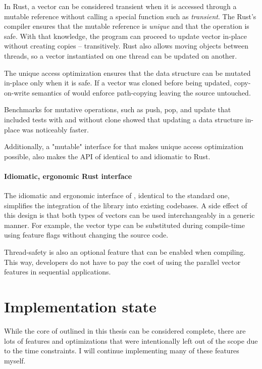 In Rust, a vector can be considered transient when it is accessed through a mutable reference without calling a special function such as \emph{transient}. The Rust's compiler ensures that the mutable reference is \emph{unique} and that the operation is safe. With that knowledge, the program can proceed to update vector in-place without creating copies -- transitively. Rust also allows moving objects between threads, so a vector instantiated on one thread can be updated on another.

The unique access optimization ensures that the data structure can be mutated in-place only when it is safe. If a vector was cloned before being updated, copy-on-write semantics of \rc{} would enforce path-copying leaving the source untouched.

Benchmarks for mutative operations, such as push, pop, and update that included tests with and without clone showed that updating a data structure in-place was noticeably faster.

Additionally, a "mutable" interface for \pvec{} that makes unique access optimization possible, also makes the API of \pvec{} identical to \stdvec{} and idiomatic to Rust.

\paragraph{Idiomatic, ergonomic Rust interface}
The idiomatic and ergonomic interface of \pvecrs{}, identical to the standard one, simplifies the integration of the library into existing codebases. A side effect of this design is that both types of vectors can be used interchangeably in a generic manner. For example, the vector type can be substituted during compile-time using feature flags without changing the source code.

Thread-safety is also an optional feature that can be enabled when compiling. This way, developers do not have to pay the cost of using the parallel vector features in sequential applications.

\section{Implementation state}
While the core of \pvecrs{} outlined in this thesis can be considered complete, there are lots of features and optimizations that were intentionally left out of the scope due to the time constraints. I will continue implementing many of these features myself.

